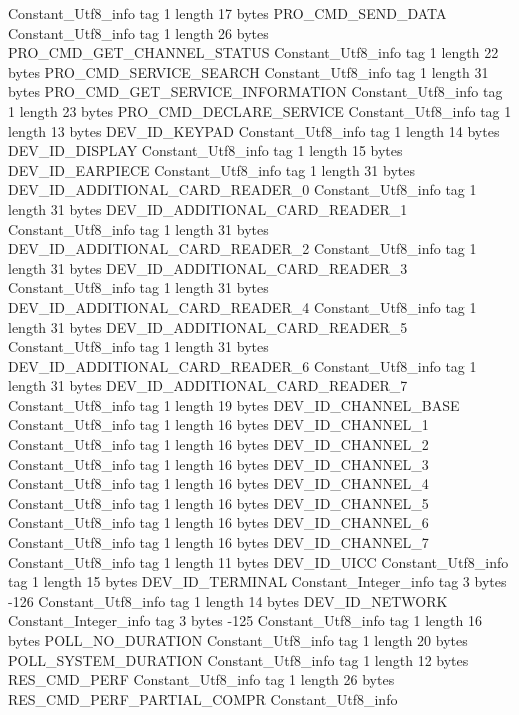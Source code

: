 {{{		}
		Constant_Utf8_info {
			tag	1
			length	17
			bytes	PRO_CMD_SEND_DATA
		}
		Constant_Utf8_info {
			tag	1
			length	26
			bytes	PRO_CMD_GET_CHANNEL_STATUS
		}
		Constant_Utf8_info {
			tag	1
			length	22
			bytes	PRO_CMD_SERVICE_SEARCH
		}
		Constant_Utf8_info {
			tag	1
			length	31
			bytes	PRO_CMD_GET_SERVICE_INFORMATION
		}
		Constant_Utf8_info {
			tag	1
			length	23
			bytes	PRO_CMD_DECLARE_SERVICE
		}
		Constant_Utf8_info {
			tag	1
			length	13
			bytes	DEV_ID_KEYPAD
		}
		Constant_Utf8_info {
			tag	1
			length	14
			bytes	DEV_ID_DISPLAY
		}
		Constant_Utf8_info {
			tag	1
			length	15
			bytes	DEV_ID_EARPIECE
		}
		Constant_Utf8_info {
			tag	1
			length	31
			bytes	DEV_ID_ADDITIONAL_CARD_READER_0
		}
		Constant_Utf8_info {
			tag	1
			length	31
			bytes	DEV_ID_ADDITIONAL_CARD_READER_1
		}
		Constant_Utf8_info {
			tag	1
			length	31
			bytes	DEV_ID_ADDITIONAL_CARD_READER_2
		}
		Constant_Utf8_info {
			tag	1
			length	31
			bytes	DEV_ID_ADDITIONAL_CARD_READER_3
		}
		Constant_Utf8_info {
			tag	1
			length	31
			bytes	DEV_ID_ADDITIONAL_CARD_READER_4
		}
		Constant_Utf8_info {
			tag	1
			length	31
			bytes	DEV_ID_ADDITIONAL_CARD_READER_5
		}
		Constant_Utf8_info {
			tag	1
			length	31
			bytes	DEV_ID_ADDITIONAL_CARD_READER_6
		}
		Constant_Utf8_info {
			tag	1
			length	31
			bytes	DEV_ID_ADDITIONAL_CARD_READER_7
		}
		Constant_Utf8_info {
			tag	1
			length	19
			bytes	DEV_ID_CHANNEL_BASE
		}
		Constant_Utf8_info {
			tag	1
			length	16
			bytes	DEV_ID_CHANNEL_1
		}
		Constant_Utf8_info {
			tag	1
			length	16
			bytes	DEV_ID_CHANNEL_2
		}
		Constant_Utf8_info {
			tag	1
			length	16
			bytes	DEV_ID_CHANNEL_3
		}
		Constant_Utf8_info {
			tag	1
			length	16
			bytes	DEV_ID_CHANNEL_4
		}
		Constant_Utf8_info {
			tag	1
			length	16
			bytes	DEV_ID_CHANNEL_5
		}
		Constant_Utf8_info {
			tag	1
			length	16
			bytes	DEV_ID_CHANNEL_6
		}
		Constant_Utf8_info {
			tag	1
			length	16
			bytes	DEV_ID_CHANNEL_7
		}
		Constant_Utf8_info {
			tag	1
			length	11
			bytes	DEV_ID_UICC
		}
		Constant_Utf8_info {
			tag	1
			length	15
			bytes	DEV_ID_TERMINAL
		}
		Constant_Integer_info {
			tag	3
			bytes	-126
		}
		Constant_Utf8_info {
			tag	1
			length	14
			bytes	DEV_ID_NETWORK
		}
		Constant_Integer_info {
			tag	3
			bytes	-125
		}
		Constant_Utf8_info {
			tag	1
			length	16
			bytes	POLL_NO_DURATION
		}
		Constant_Utf8_info {
			tag	1
			length	20
			bytes	POLL_SYSTEM_DURATION
		}
		Constant_Utf8_info {
			tag	1
			length	12
			bytes	RES_CMD_PERF
		}
		Constant_Utf8_info {
			tag	1
			length	26
			bytes	RES_CMD_PERF_PARTIAL_COMPR
		}
		Constant_Utf8_info {
}}}
